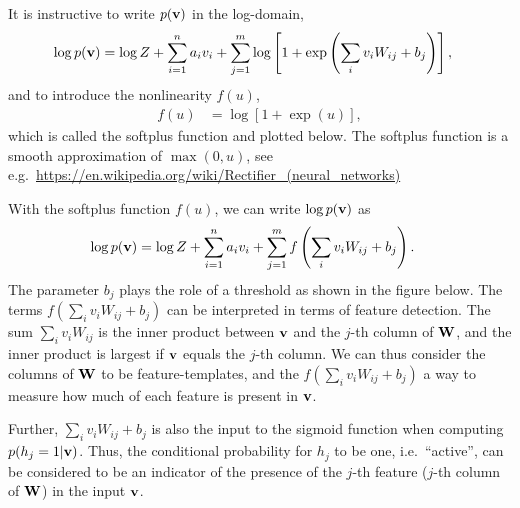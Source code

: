 \begin{exenumerate}
\begin{solution}
       It is instructive to write $p(\mathbf{v})$ in the log-domain,
       \begin{align}
         \log p(\mathbf{v}) & = \log Z + \sum_{i=1}^n a_i v_i + \sum_{j=1}^m \log\left[1+ \exp\left(\sum_i v_i W_{ij} + b_j \right)\right],
       \end{align}
       and to introduce the nonlinearity $f(u)$,
       \begin{align}
         f(u) & = \log\left[ 1+\exp(u) \right],
       \end{align}
       which is called the softplus function and plotted below. The softplus function is a smooth approximation of $\max(0,u)$, see e.g.\ \url{https://en.wikipedia.org/wiki/Rectifier_(neural_networks)}
       \begin{center}
         \vspace{3ex}
      \end{center}
       With the softplus function $f(u)$, we can write $\log p(\mathbf{v})$ as
       \begin{align}
         \log p(\mathbf{v}) & = \log Z + \sum_{i=1}^n a_i v_i + \sum_{j=1}^m f\left(\sum_i v_i W_{ij} + b_j \right).
       \end{align}
       The parameter $b_j$ plays the role of a threshold as shown in
       the figure below. The terms $f\left(\sum_i v_i W_{ij} + b_j
       \right)$ can be interpreted in terms of feature detection. The
       sum $\sum_i v_i W_{ij}$ is the inner product between $\mathbf{v}$ and
       the $j$-th column of $\mathbf{W}$, and the inner product is largest if
       $\mathbf{v}$ equals the $j$-th column. We can thus consider the columns
       of $\mathbf{W}$ to be feature-templates, and the $f\left(\sum_i v_i
       W_{ij} + b_j \right)$ a way to measure how much of each feature
       is present in $\mathbf{v}$.

       Further, $\sum_i v_i W_{ij} +b_j$ is also the input to the
       sigmoid function when computing $p(h_j=1 | \mathbf{v})$. Thus, the
       conditional probability for $h_j$ to be one, i.e.\ ``active'',
       can be considered to be an indicator of the presence of the
       $j$-th feature ($j$-th column of $\mathbf{W}$) in the input $\mathbf{v}$.


\end{solution}
\end{exenumerate}
